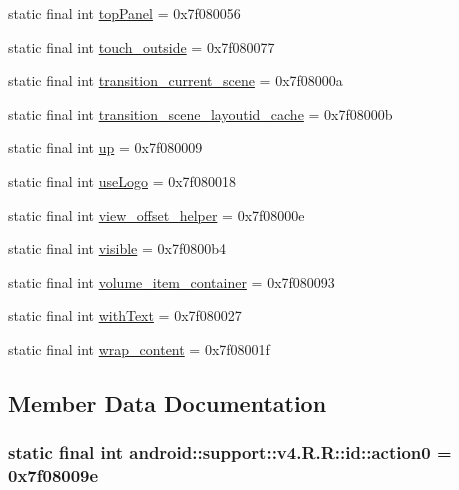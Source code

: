 \begin{CompactItemize}
\item 
static final int \hyperlink{classandroid_1_1support_1_1v4_1_1_r_1_1id_a93e4c92ff456d0d573020bc08916e7c}{topPanel} = 0x7f080056
\item 
static final int \hyperlink{classandroid_1_1support_1_1v4_1_1_r_1_1id_dd6676c8f3f8b4f850062100e0ba06e8}{touch\_\-outside} = 0x7f080077
\item 
static final int \hyperlink{classandroid_1_1support_1_1v4_1_1_r_1_1id_1269bc9f136ad91fc347480575b5e675}{transition\_\-current\_\-scene} = 0x7f08000a
\item 
static final int \hyperlink{classandroid_1_1support_1_1v4_1_1_r_1_1id_9b24ee02b1ce88471628e84e506fd3ca}{transition\_\-scene\_\-layoutid\_\-cache} = 0x7f08000b
\item 
static final int \hyperlink{classandroid_1_1support_1_1v4_1_1_r_1_1id_7fefb00e3b06099ee3938c1413dcff6d}{up} = 0x7f080009
\item 
static final int \hyperlink{classandroid_1_1support_1_1v4_1_1_r_1_1id_55134484119159c565e3be09d977105e}{useLogo} = 0x7f080018
\item 
static final int \hyperlink{classandroid_1_1support_1_1v4_1_1_r_1_1id_8c10cf99a60fd6f08dbf9fefddd68c47}{view\_\-offset\_\-helper} = 0x7f08000e
\item 
static final int \hyperlink{classandroid_1_1support_1_1v4_1_1_r_1_1id_ad5cd33cb0266fb810604994e17f3dbc}{visible} = 0x7f0800b4
\item 
static final int \hyperlink{classandroid_1_1support_1_1v4_1_1_r_1_1id_6c57df3484afc8f6738ef5fc85a30d30}{volume\_\-item\_\-container} = 0x7f080093
\item 
static final int \hyperlink{classandroid_1_1support_1_1v4_1_1_r_1_1id_9b2ad10196c2ca05edf3e8106ee2d2b7}{withText} = 0x7f080027
\item 
static final int \hyperlink{classandroid_1_1support_1_1v4_1_1_r_1_1id_b4f07baa4e8af21329b1e69b7be9d6e4}{wrap\_\-content} = 0x7f08001f
\end{CompactItemize}


\subsection{Member Data Documentation}
\hypertarget{classandroid_1_1support_1_1v4_1_1_r_1_1id_85ee1eff2a0e5e979ff6437daeb9370b}{
\subsubsection[{action0}]{\setlength{\rightskip}{0pt plus 5cm}static final int android::support::v4.R.R::id::action0 = 0x7f08009e}}
\label{classandroid_1_1support_1_1v4_1_1_r_1_1id_85ee1eff2a0e5e979ff6437daeb9370b}


